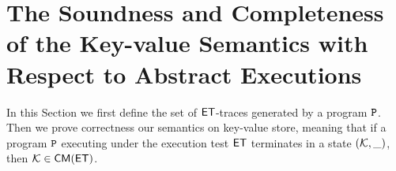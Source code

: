 \section{The Soundness and Completeness of the Key-value Semantics with Respect to Abstract Executions}

\label{sec:kv-sound-complete-proof}
In this Section we first define the set of $\mathsf{ET}$-traces generated by a program $\mathtt{P}$. 
Then we prove correctness our semantics on key-value store,
meaning that if a program $\mathtt{P}$ executing under the execution 
test $\mathsf{ET}$ terminates in a state $(\mathcal{K}, \_)$, then $\mathcal{K} \in \mathsf{CM}(\mathsf{ET})$. 





